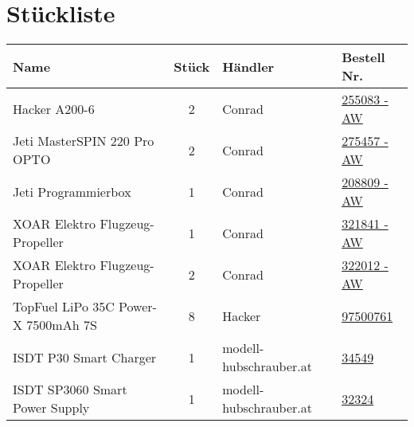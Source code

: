 \section{Stückliste}

\begin{table}[h]
    \begin{threeparttable}
    \centering
    \begin{tabular}{|l|c|M{3cm}|l|}
        \hline
    Name                         & Stück & Händler & Bestell Nr. \\\hline
    Hacker A200-6                & 2      & Conrad  & \href{https://www.conrad.at/de/p/hacker-a200-6-flugmodell-brushless-elektromotor-kv-u-min-pro-volt-151-255083.html}{255083 - AW} \\
    Jeti MasterSPIN 220 Pro OPTO & 2      & Conrad  & \href{https://www.conrad.at/de/p/jeti-masterspin-220-pro-opto-flugmodell-brushless-flugregler-275457.html}{275457 - AW} \\
    Jeti Programmierbox          & 1      & Conrad  & \href{https://www.conrad.at/de/p/jeti-programmierbox-passend-fuer-masterbasic-regler-serie-masterspin-regler-serie-jeti-spin-regler-serie-jeti-duplex-208809.html}{208809 - AW} \\
    XOAR Elektro Flugzeug-Propeller & 1 & Conrad & \href{https://www.conrad.at/de/p/xoar-elektro-flugzeug-propeller-28-x-12-zoll-71-1-x-30-5-cm-35280120-321841.html}{321841 - AW} \\
    XOAR Elektro Flugzeug-Propeller & 2 & Conrad & \href{https://www.conrad.de/de/p/xoar-elektro-flugzeug-propeller-28-x-10-zoll-71-1-x-25-4-cm-36280120-322012.html}{322012 - AW}\\\hline
    TopFuel LiPo 35C Power-X 7500mAh 7S & 8 & Hacker & \href{https://www.hacker-motor-shop.com/Akkus-und-Akkuzubehoer/Akkusuche/TF-Power-X-7500-7S-MTAG.htm?SessionId=&a=article&ProdNr=97500761&p=11452}{97500761} \\\hline
    ISDT P30 Smart Charger & 1 & modell-hubschrauber.at & \href{https://www.modell-hubschrauber.at/Ladegeraete-Netzteile-Ladekabel-und-Zubehoer/Ladegeraete/Ladegeraete-12Volt/iSDT-SMART-Dup-Ladegeraet-P30-1500W-30A-8S-Lipo::43075.html}{34549}\\
    ISDT SP3060 Smart Power Supply & 1 & modell-hubschrauber.at & \href{https://www.modell-hubschrauber.at/Ladegeraete-Netzteile-Ladekabel-und-Zubehoer/Netzteile/iSDT-SP3060-SMART-POWER-Schaltnetzteil-21-29Volt-60Ampere-1800Watt::40657.html}{32324}\\\hline

\end{tabular}
\end{threeparttable}
\end{table}
